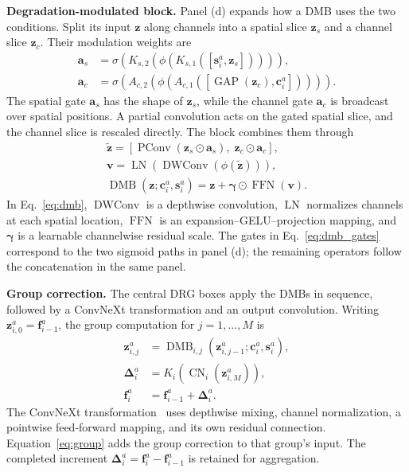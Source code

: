 \documentclass[10pt,journal,letterpaper]{IEEEtran}
\begin{document}
\noindent\textbf{Degradation-modulated block.}
Panel (d) expands how a DMB uses the two conditions. Split its input $\mathbf z$ along channels into a spatial slice $\mathbf z_s$ and a channel slice $\mathbf z_c$. Their modulation weights are
\begin{equation}
\begin{aligned}
\mathbf a_s&=\sigma\!\left(K_{s,2}(\phi(K_{s,1}([\mathbf s_i^a,\mathbf z_s])))\right),\\
\mathbf a_c&=\sigma\!\left(A_{c,2}(\phi(A_{c,1}([\operatorname{GAP}(\mathbf z_c),\mathbf c_i^a])))\right).
\end{aligned}
\label{eq:dmb_gates}
\end{equation}
The spatial gate $\mathbf a_s$ has the shape of $\mathbf z_s$, while the channel gate $\mathbf a_c$ is broadcast over spatial positions. A partial convolution acts on the gated spatial slice, and the channel slice is rescaled directly. The block combines them through
\begin{equation}
\begin{gathered}
\widetilde{\mathbf z}=[\operatorname{PConv}(\mathbf z_s\odot\mathbf a_s),\;
                         \mathbf z_c\odot\mathbf a_c],\\
\mathbf v=\operatorname{LN}\!\left(\operatorname{DWConv}(\phi(\widetilde{\mathbf z}))\right),\\
\operatorname{DMB}(\mathbf z;\mathbf c_i^a,\mathbf s_i^a)
 =\mathbf z+\boldsymbol\gamma\odot\operatorname{FFN}(\mathbf v).
\end{gathered}
\label{eq:dmb}
\end{equation}
In Eq.~\eqref{eq:dmb}, $\operatorname{DWConv}$ is a depthwise convolution, $\operatorname{LN}$ normalizes channels at each spatial location, $\operatorname{FFN}$ is an expansion--GELU--projection mapping, and $\boldsymbol\gamma$ is a learnable channelwise residual scale. The gates in Eq.~\eqref{eq:dmb_gates} correspond to the two sigmoid paths in panel (d); the remaining operators follow the concatenation in the same panel.

\noindent\textbf{Group correction.}
The central DRG boxes apply the DMBs in sequence, followed by a ConvNeXt transformation and an output convolution. Writing $\mathbf z_{i,0}^a=\mathbf f_{i-1}^a$, the group computation for $j=1,\ldots,M$ is
\begin{equation}
\begin{aligned}
\mathbf z_{i,j}^a&=\operatorname{DMB}_{i,j}(\mathbf z_{i,j-1}^a;\mathbf c_i^a,\mathbf s_i^a),\\
\boldsymbol\Delta_i^a&=K_i\!\left(\operatorname{CN}_i(\mathbf z_{i,M}^a)\right),\\
\mathbf f_i^a&=\mathbf f_{i-1}^a+\boldsymbol\Delta_i^a.
\end{aligned}
\label{eq:group}
\end{equation}
The ConvNeXt transformation~\cite{liu2022convnext} uses depthwise mixing, channel normalization, a pointwise feed-forward mapping, and its own residual connection. Equation~\eqref{eq:group} adds the group correction to that group's input. The completed increment $\boldsymbol\Delta_i^a=\mathbf f_i^a-\mathbf f_{i-1}^a$ is retained for aggregation.
\end{document}
